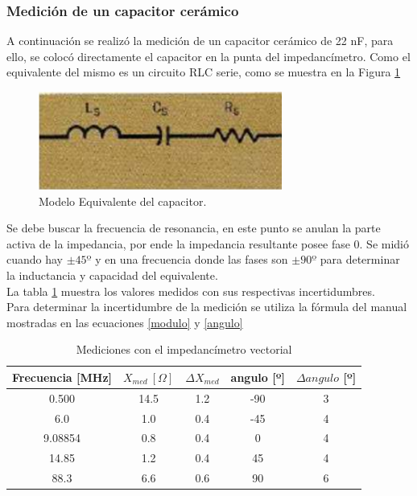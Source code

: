 \documentclass[a4paper,10pt]{article}
\begin{document}
		\subsubsection{Medición de un capacitor cerámico}
		\indent A continuación se realizó la medición de un capacitor cerámico
		de 22 nF, para ello, se colocó directamente el capacitor en la punta 
		del impedancímetro. Como el equivalente del mismo es un circuito RLC 
		serie, como se muestra en la Figura \ref{imagenCapacitor} 
		
		\begin{figure}[!htb]
			\centering
			\includegraphics[width=8cm]{Imagenes/EsqCapacitor.png}
			\caption{Modelo Equivalente del capacitor.}
			\label{imagenCapacitor} 
		\end{figure}
		
		Se debe buscar la frecuencia de resonancia, en este punto se anulan la 
		parte activa de la impedancia, por ende la impedancia resultante posee
		fase 0. Se midió cuando hay $\pm 45º$ y en una frecuencia donde las fases
		son $\pm 90º$ para determinar la inductancia y capacidad del equivalente.
		\\
		\indent La tabla \ref{unaTab} muestra los valores medidos con sus 
		respectivas incertidumbres. \\
		\indent Para determinar la incertidumbre de la medición se utiliza la 
		fórmula del manual mostradas en las ecuaciones \ref{modulo} y 
		\ref{angulo}
		
		\begin{table}[!htp]
			\centering
			\begin{tabular}{|c|c|c|c|c|}
				\hline
				Frecuencia [MHz] & $X_{med}~[\Omega] $ & $\Delta X_{med}$ & 
				angulo [º] & $\Delta angulo$ [º] \\
				\hline
				0.500 & 14.5 & 1.2 & -90 & 3 \\
				\hline
				6.0 & 1.0 & 0.4 & -45 & 4 \\
				\hline
				9.08854 & 0.8 & 0.4 & 0 & 4 \\ 
				\hline
				14.85 & 1.2 & 0.4 & 45 & 4 \\
				\hline
				88.3 & 6.6 & 0.6 & 90 & 6 \\ 
				\hline									
			\end{tabular}
			\caption{Mediciones con el impedancímetro vectorial} \label{unaTab}
		\end{table}
\end{document}
